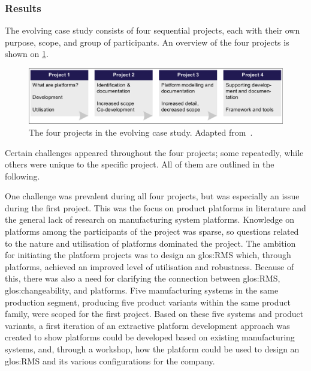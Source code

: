 \subsubsection*{Results}
The evolving case study consists of four sequential projects, each with their own purpose, scope, and group of participants.
An overview of the four projects is shown on \cref{fig:evoCase}.
\begin{figure}[tb]
  \centering
  \includegraphics[width=.9\textwidth, trim= 2 4 2 2, clip]{mainmatter/researchResults/figures/evoCase.pdf}
  \caption[The four projects in the evolving case study.]
  {The four projects in the evolving case study.
  Adapted from~\parencite{SorensenAPMS2018}.}\label{fig:evoCase}
\end{figure}
Certain challenges appeared throughout the four projects; some repeatedly, while others were unique to the specific project.
All of them are outlined in the following.

One challenge was prevalent during all four projects, but was especially an issue during the first project.
This was the focus on product platforms in literature and the general lack of research on manufacturing system platforms.
Knowledge on platforms among the participants of the project was sparse, so questions related to the nature and utilisation of platforms dominated the project.
The ambition for initiating the platform projects was to design an \gls{glos:RMS} which, through platforms, achieved an improved level of utilisation and robustness.
Because of this, there was also a need for clarifying the connection between \gls{glos:RMS}, \gls{glos:changeability}, and platforms.
Five manufacturing systems in the same production segment, producing five product variants within the same product family, were scoped for the first project.
Based on these five systems and product variants, a first iteration of an extractive platform development approach was created to show platforms could be developed based on existing manufacturing systems, and, through a workshop, how the platform could be used to design an \gls{glos:RMS} and its various configurations for the company.

